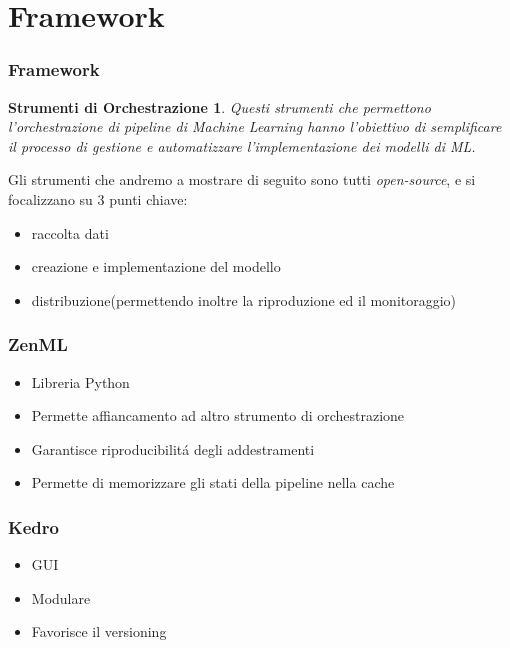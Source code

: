 \documentclass[xcolor=dvipsnames]{beamer}
\begin{document}
\section{Framework}

\begin{frame}    
        \frametitle{Framework}
        \newtheorem{fw}{Strumenti di Orchestrazione}

        \begin{fw}
            Questi strumenti che permettono l'orchestrazione di pipeline di Machine Learning  hanno l'obiettivo di semplificare il processo di gestione e automatizzare l'implementazione dei modelli di ML.
        \end{fw}
        Gli strumenti che andremo a mostrare di seguito sono tutti \textit{open-source}, e si focalizzano su 3 punti chiave:
        \begin{itemize}
            \item raccolta dati
            \item creazione e implementazione del modello
            \item distribuzione(permettendo inoltre la riproduzione ed il monitoraggio)
        \end{itemize}
\end{frame}
\begin{frame}
    \frametitle{ZenML}
    \begin{itemize}
        \item Libreria Python
        \item Permette affiancamento ad altro strumento di orchestrazione
        \item Garantisce riproducibilitá degli addestramenti
        \item Permette di memorizzare gli stati della pipeline nella cache %
    \end{itemize}

\end{frame}

\begin{frame}
    \frametitle{Kedro}

    \begin{itemize}
        \item GUI
        \item Modulare
        \item Favorisce il versioning
    \end{itemize}

\end{frame}
\end{document}
